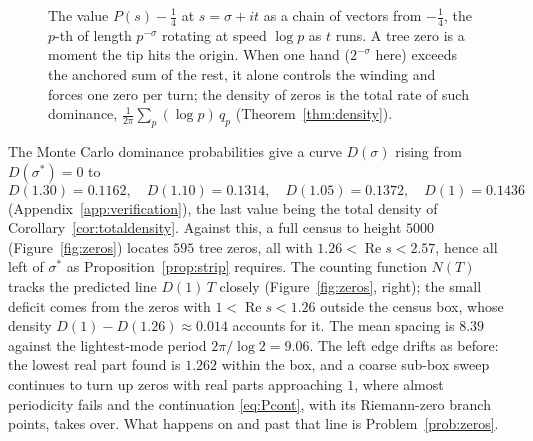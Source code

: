 \documentclass[11pt]{article}
\numberwithin{equation}{section}
\theoremstyle{plain}
\theoremstyle{definition}
\theoremstyle{remark}
\begin{document}
\begin{figure}[t]
\centering
{}
\caption{The value $P(s) - \tfrac14$ at $s = \sigma + it$ as a chain of vectors from
$-\tfrac14$, the $p$-th of length $p^{-\sigma}$ rotating at speed $\log p$ as $t$
runs. A tree zero is a moment the tip hits the origin. When one hand
($2^{-\sigma}$ here) exceeds the anchored sum of the rest, it alone controls the
winding and forces one zero per turn; the density of zeros is the total rate of such
dominance, $\frac{1}{2\pi}\sum_p (\log p)\, q_p$ (Theorem~\ref{thm:density}).}
\label{fig:hands}
\end{figure}

The Monte Carlo dominance probabilities give a curve $D(\sigma)$ rising from
$D(\sigma^{*}) = 0$ to
\[
D(1.30) = 0.1162, \quad D(1.10) = 0.1314, \quad D(1.05) = 0.1372, \quad
D(1) = 0.1436
\]
(Appendix~\ref{app:verification}), the last value being the total density of
Corollary~\ref{cor:totaldensity}. Against this, a full census to height $5000$
(Figure~\ref{fig:zeros}) locates $595$ tree zeros, all with
$1.26 < \operatorname{Re} s < 2.57$, hence all left of $\sigma^{*}$ as
Proposition~\ref{prop:strip} requires. The counting function $N(T)$ tracks the
predicted line $D(1)\,T$ closely (Figure~\ref{fig:zeros}, right); the small deficit
comes from the zeros with $1 < \operatorname{Re} s < 1.26$ outside the census box,
whose density $D(1) - D(1.26) \approx 0.014$ accounts for it. The
mean spacing is $8.39$ against the lightest-mode period $2\pi/\log 2 = 9.06$. The
left edge drifts as before: the lowest real part found is $1.262$ within the box, and
a coarse sub-box sweep continues to turn up zeros with real parts approaching $1$,
where almost periodicity fails and the continuation \eqref{eq:Pcont}, with its
Riemann-zero branch points, takes over. What happens on and past that line is
Problem~\ref{prob:zeros}.
\end{document}
